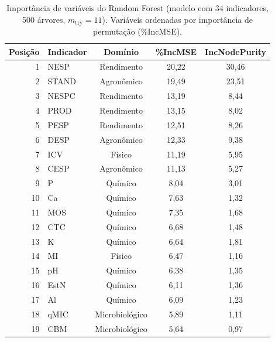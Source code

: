 \documentclass[12pt]{article}
\begin{document}
\begin{table}[ht]
\end{table}

\clearpage
\begin{table}[ht]
\centering
\caption{Importância de variáveis do Random Forest (modelo com 34 indicadores, 500 árvores, $m_{\text{try}} = 11$). Variáveis ordenadas por importância de permutação (\%IncMSE).}\label{tab:s4_rf}
\begin{tabular}{rlccc}
\toprule
Posição & Indicador & Domínio & \%IncMSE & IncNodePurity \\
\midrule
1  & NESP  & Rendimento      & 20,22 & 30,46 \\
2  & STAND & Agronômico      & 19,49 & 23,51 \\
3  & NESPC & Rendimento      & 13,19 & 8,44 \\
4  & PROD  & Rendimento      & 13,15 & 8,02 \\
5  & PESP  & Rendimento      & 12,51 & 8,26 \\
6  & DESP  & Agronômico      & 12,33 & 9,38 \\
7  & ICV   & Físico          & 11,19 & 5,95 \\
8  & CESP  & Agronômico      & 11,13 & 5,27 \\
9  & P     & Químico         & 8,04 & 3,01 \\
10 & Ca    & Químico         & 7,63 & 1,32 \\
11 & MOS   & Químico         & 7,35 & 1,68 \\
12 & CTC   & Químico         & 6,68 & 1,48 \\
13 & K     & Químico         & 6,64 & 1,81 \\
14 & MI    & Físico          & 6,47 & 1,16 \\
15 & pH    & Químico         & 6,38 & 1,35 \\
16 & EstN  & Químico         & 6,11 & 1,36 \\
17 & Al    & Químico         & 6,09 & 1,23 \\
18 & qMIC  & Microbiológico  & 5,89 & 1,11 \\
19 & CBM   & Microbiológico  & 5,64 & 0,97 \\

\end{tabular}
\end{table}
\end{document}
